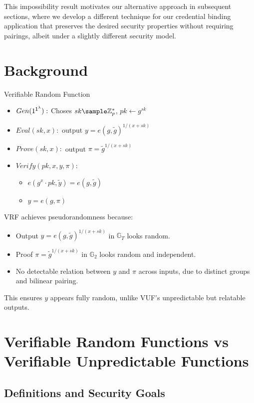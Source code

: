 This impossibility result motivates our alternative approach in subsequent sections, where we develop a different technique for our credential binding application that preserves the desired security properties without requiring pairings, albeit under a slightly different security model.





\section{Background}


Verifiable Random Function
\begin{itemize}
    \item $Gen(1^{\mathsf{1^{\lambda}}}):$ Choses $sk \sample \Z_p^*$, $pk \gets g^{sk}$
    \item $Eval(sk, x):$ output $y = e(g, \tilde{g})^{1/(x + sk)}$
    \item $Prove(sk, x):$ output $\pi = \tilde{g}^{1/(x + sk)}$
    \item $Verify(pk, x, y, \pi)$: 
        \begin{itemize}
            \item $e(g^x \cdot pk, \tilde{y}) = e(g, \tilde{g})$ 
            \item $y = e(g, \pi)$
        \end{itemize}
\end{itemize}

VRF achieves pseudorandomness because:
\begin{itemize}
    \item Output $ y = e(g, \tilde{g})^{1/(x + sk)} $ in $ \mathbb{G}_T $ looks random.
    \item Proof $ \pi = \tilde{g}^{1/(x + sk)} $ in $ \mathbb{G}_2 $ looks random and independent.
    \item No detectable relation between $ y $ and $ \pi $ across inputs, due to distinct groups and bilinear pairing.
\end{itemize}
This ensures $ y $ appears fully random, unlike VUF's unpredictable but relatable outputs.



\section{Verifiable Random Functions vs Verifiable Unpredictable Functions}

\subsection{Definitions and Security Goals}

